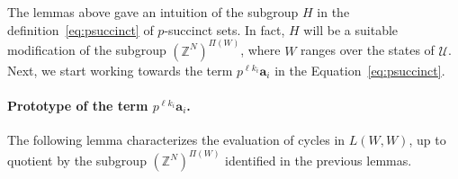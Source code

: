 \documentclass[letterpaper, 11pt, thm-restate]{article}
\numberwithin{equation}{section}
\newcommand{\Z}{\mathbb{Z}}
\newcommand{\ba}{\boldsymbol{a}}
\newcommand{\mmU}{\mathscr{U}}
\theoremstyle{definition}
\theoremstyle{definition}
\theoremstyle{definition}
\begin{document}
The lemmas above gave an intuition of the subgroup $H$ in the definition~\eqref{eq:psuccinct} of $p$-succinct sets.
In fact, $H$ will be a suitable modification of the subgroup $(\Z^{N})^{\Pi(W)}$, where $W$ ranges over the states of $\mmU$.
Next, we start working towards the term $p^{\ell k_i} \ba_i$ in the Equation~\eqref{eq:psuccinct}.

\paragraph{Prototype of the term $p^{\ell k_i} \ba_i$.}

The following lemma characterizes the evaluation of cycles in $L(W, W)$, up to quotient by the subgroup $(\Z^{N})^{\Pi(W)}$ identified in the previous lemmas.
\end{document}
